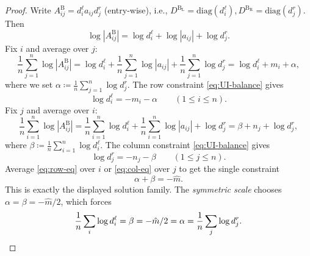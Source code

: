 \documentclass[10pt,a4paper]{amsart}
\newcommand{\diag}{\mathrm{diag}}
\begin{document}
\begin{proof}
Write $A^\mathrm{B}_{ij}=d^\ell_i a_{ij} {d^r_j}$ (entry-wise), i.e., $D^\mathrm{B_L}=\diag(d^\ell_i),D^\mathrm{B_R}=\diag({d^r_j})$. Then
\begin{equation}
\log|A^\mathrm{B}_{ij}|=\log d^\ell_i+\log|a_{ij}|+\log {d^r_j}.
\end{equation}
Fix $i$ and average over $j$:
\begin{equation}
\frac1n\sum_{j=1}^n \log|A^\mathrm{B}_{ij}|
= \log d^\ell_i+\frac1n\sum_{j=1}^n\log|a_{ij}|+\frac1n\sum_{j=1}^n\log {d^r_j}
= \log d^\ell_i+m_i+\alpha,
\end{equation}
where we set $\alpha\coloneq \frac1n\sum_{j=1}^n \log {d^r_j}$. The row constraint \cref{eq:UI-balance} gives
\begin{equation}\label{eq:row-eq}
\log d^\ell_i=-m_i-\alpha\qquad(1\le i\le n).
\end{equation}
Fix $j$ and average over $i$:
\begin{equation}
\frac1n\sum_{i=1}^n \log|A^\mathrm{B}_{ij}|
= \frac1n\sum_{i=1}^n\log d^\ell_i+\frac1n\sum_{i=1}^n\log|a_{ij}|+\log {d^r_j}
= \beta+n_j+\log {d^r_j},
\end{equation}
where $\beta\coloneq \frac1n\sum_{i=1}^n \log d^\ell_i$. The column constraint \cref{eq:UI-balance} gives
\begin{equation}\label{eq:col-eq}
\log {d^r_j}=-n_j-\beta\qquad(1\le j\le n).
\end{equation}
Average \cref{eq:row-eq} over $i$ or \cref{eq:col-eq} over $j$ to get the single constraint
\begin{equation}
\alpha+\beta=-\hat{m}.
\end{equation}
This is exactly the displayed solution family. The \emph{symmetric scale} chooses $\alpha=\beta=-\hat{m}/2$, which forces
\begin{equation}
\frac1n\sum_i \log d^\ell_i=\beta=-\hat{m}/2=\alpha=\frac1n\sum_j \log {d^r_j}.\qedhere
\end{equation}
\end{proof}
\end{document}
